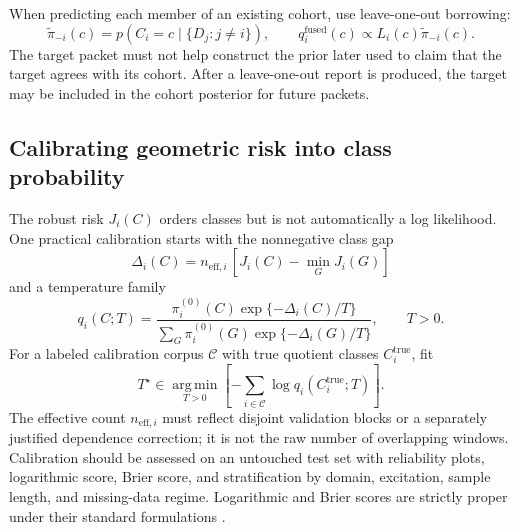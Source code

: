 \documentclass[11pt]{article}
\newcommand{\argmin}{\operatorname*{arg\,min}}
\begin{document}
    When predicting each member of an existing cohort, use leave-one-out borrowing:
    \begin{equation}
        \widetilde\pi_{-i}(c)
        =p(C_i=c\mid\{D_j:j\ne i\}),
        \qquad
        q_i^{\mathrm{fused}}(c)
        \propto L_i(c)\widetilde\pi_{-i}(c).
        \label{eq:cohort-loo}
    \end{equation}
    The target packet must not help construct the prior later used to claim that the target
    agrees with its cohort. After a leave-one-out report is produced, the target may be
    included in the cohort posterior for future packets.

    \subsection{Calibrating geometric risk into class probability}

    The robust risk $J_i(C)$ orders classes but is not automatically a log likelihood.
    One practical calibration starts with the nonnegative class gap
    \begin{equation}
        \Delta_i(C)
        =n_{\mathrm{eff},i}\,[J_i(C)-\min_GJ_i(G)]
        \label{eq:cohort-risk-gap}
    \end{equation}
    and a temperature family
    \begin{equation}
        q_i(C;T)
        =\frac{\pi_i^{(0)}(C)\exp\{-\Delta_i(C)/T\}}
        {\sum_G\pi_i^{(0)}(G)\exp\{-\Delta_i(G)/T\}},
        \qquad T>0.
        \label{eq:cohort-temperature-posterior}
    \end{equation}
    For a labeled calibration corpus $\mathcal C$ with true quotient classes
    $C_i^{\mathrm{true}}$, fit
    \begin{equation}
        T^\star
        \in\argmin_{T>0}
        \left[-\sum_{i\in\mathcal C}
            \log q_i(C_i^{\mathrm{true}};T)\right].
        \label{eq:cohort-temperature-fit}
    \end{equation}
    The effective count $n_{\mathrm{eff},i}$ must reflect disjoint validation blocks or a
    separately justified dependence correction; it is not the raw number of overlapping
    windows. Calibration should be assessed on an untouched test set with reliability
    plots, logarithmic score, Brier score, and stratification by domain, excitation, sample
    length, and missing-data regime. Logarithmic and Brier scores are strictly proper under
    their standard formulations \cite{gneiting2007}.
\end{document}
